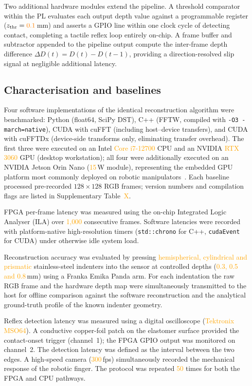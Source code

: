 \documentclass[10pt,a4paper]{article}
\newcommand{\placeholder}[1]{\textcolor{orange}{#1}}
\begin{document}
Two additional hardware modules extend the pipeline. A threshold comparator within the PL evaluates each output depth value against a programmable register ($z_\mathrm{thr} = \placeholder{0.1}$\,mm) and asserts a GPIO line within one clock cycle of detecting contact, completing a tactile reflex loop entirely on-chip. A frame buffer and subtractor appended to the pipeline output compute the inter-frame depth difference $\Delta D(t) = D(t) - D(t{-}1)$, providing a direction-resolved slip signal at negligible additional latency.

\subsection*{Characterisation and baselines}

Four software implementations of the identical reconstruction algorithm were benchmarked: Python (float64, SciPy DST), C++ (FFTW, compiled with \texttt{-O3 -march=native}), CUDA with cuFFT (including host--device transfers), and CUDA with cuFFTDx (device-side transforms only, eliminating transfer overhead). The first three were executed on an Intel \placeholder{Core i7-12700} CPU and an NVIDIA \placeholder{RTX 3060} GPU (desktop workstation); all four were additionally executed on an NVIDIA Jetson Orin Nano (\placeholder{15}\,W module), representing the embedded GPU platform most commonly deployed on robotic manipulators~\cite{mittal2019jetsonsurvey}. Each baseline processed pre-recorded $128 \times 128$ RGB frames; version numbers and compilation flags are listed in Supplementary Table~\placeholder{X}.

FPGA per-frame latency was measured using the on-chip Integrated Logic Analyser (ILA) over \placeholder{1{,}000} consecutive frames. Software latencies were recorded with platform-native high-resolution timers (\texttt{std::chrono} for C++, \texttt{cudaEvent} for CUDA) under otherwise idle system load.

Reconstruction accuracy was evaluated by pressing \placeholder{hemispherical, cylindrical and prismatic} stainless-steel indenters into the sensor at controlled depths (\placeholder{0.3, 0.5 and 0.8}\,mm) using a Franka Emika Panda arm. For each indentation the raw RGB frame and the hardware depth map were simultaneously transmitted to the host for offline comparison against the software reconstruction and the analytical ground-truth profile of the known indenter geometry.

Reflex detection latency was measured using a digital oscilloscope (\placeholder{Tektronix MSO64}). A conductive copper-foil patch on the elastomer surface provided the contact-onset trigger (channel~1); the FPGA GPIO output was monitored on channel~2. The detection latency was defined as the interval between the two edges. A high-speed camera (\placeholder{300}\,fps) simultaneously recorded the mechanical response of the robotic finger. The protocol was repeated \placeholder{50} times for both the FPGA and CPU pathways.
\end{document}
